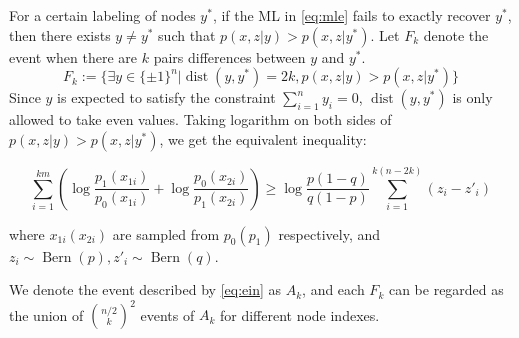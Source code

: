 \documentclass[conference,letterpaper]{IEEEtran}
\DeclareMathOperator{\dist}{dist}
\DeclareMathOperator{\Bern}{Bern}
\begin{document}
For a certain labeling of nodes $y^*$,
if the ML in \eqref{eq:mle} fails to exactly recover $y^*$, then
there exists $y\neq y^*$ such that $p(x,z|y) > p(x,z|y^*)$.
Let $F_k$ denote
the event when there are $k$ pairs differences
between $y$ and $y^*$.
\begin{equation}\label{eq:Fk}
F_k:=\{\exists y \in \{\pm 1\}^n | \dist(y, y^*)=2k, p(x,z|y) > p(x,z|y^*) \}
\end{equation}
Since
$y$ is expected to satisfy the constraint $\sum_{i=1}^n y_i=0$, $\dist(y, y^*)$ is only allowed to take even
values. Taking logarithm on both sides of $p(x,z|y) > p(x,z|y^*)$, we get the equivalent inequality:

\begin{equation}\label{eq:ein}
\sum_{i=1}^{km} \left(\log \frac{p_1(x_{1i})}{p_0(x_{1i})}
+ \log \frac{p_0(x_{2i})}{p_1(x_{2i})}\right)
\geq \log \frac{p(1-q)}{q(1-p)} \sum_{i=1}^{k(n-2k)}(z_{i} - z'_{i})
\end{equation}

where $x_{1i}(x_{2i})$ are sampled from $p_0(p_1)$ respectively,
and $z_{i} \sim \Bern(p), z'_{i} \sim \Bern(q)$.

We denote the event described by \eqref{eq:ein} as $A_k$,
and each $F_k$ can be regarded as the union of $\binom{n/2}{k}^2$ events
of $A_k$ for different node indexes.
\end{document}
